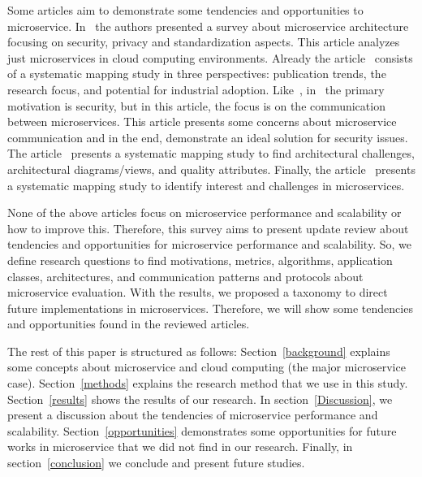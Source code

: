 Some articles aim to demonstrate some tendencies and opportunities to microservice. In~\cite{Almeida2017SurveyEnvironment} the authors presented a survey about microservice architecture focusing on security, privacy and standardization aspects. This article analyzes just microservices in cloud computing environments. Already the article~\cite{Francesco2017ResearchAdoption} consists of a systematic mapping study in three perspectives: publication trends, the research focus, and potential for industrial adoption. Like~\cite{Almeida2017SurveyEnvironment}, in~\cite{Yu2018AApplications} the primary motivation is security, but in this article, the focus is on the communication between microservices. This article presents some concerns about microservice communication and in the end, demonstrate an ideal solution for security issues. The article~\cite{Alshuqayran2016AArchitecture} presents a systematic mapping study to find architectural challenges, architectural diagrams/views, and quality attributes. Finally, the article~\cite{Cerny2018ContextualArchitecture} presents a systematic mapping study to identify interest and challenges in microservices. 

None of the above articles focus on microservice performance and scalability or how to improve this. Therefore, this survey aims to present update review about tendencies and opportunities for microservice performance and scalability. So, we define research questions to find motivations, metrics, algorithms, application classes, architectures, and communication patterns and protocols about microservice evaluation. With the results, we proposed a taxonomy to direct future implementations in microservices. Therefore, we will show some tendencies and opportunities found in the reviewed articles.

The rest of this paper is structured as follows: Section~\ref{background} explains some concepts about microservice and cloud computing (the major microservice case). Section~\ref{methods} explains the research method that we use in this study. Section~\ref{results} shows the results of our research. In section~\ref{Discussion}, we present a discussion about the tendencies of microservice performance and scalability. Section~\ref{opportunities} demonstrates some opportunities for future works in microservice that we did not find in our research. Finally, in section~\ref{conclusion} we conclude and present future studies.